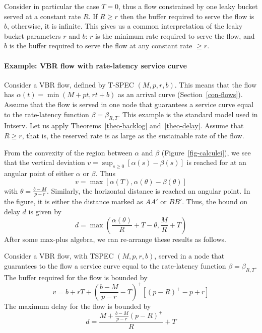 Consider in particular the case $T=0$, thus a flow constrained by
one leaky bucket served at a constant rate $R$. If $R\geq r$ then
the buffer required to serve the flow is $b$, otherwise, it is
infinite. This gives us a common interpretation of the leaky
bucket parameters $r$ and $b$: $r$ is the minimum rate required to
serve the flow, and $b$ is the buffer required to serve the flow
at any constant rate $\geq r$.


\paragraph{Example: VBR flow with rate-latency service curve}
Consider a VBR flow, defined by T-SPEC $(M, p, r, b)$. This means
that the flow has $\alpha(t) = \min(M+pt, rt+b)$ as an arrival
curve (Section~\ref{con-flows}). Assume that the flow is served in
one node that guarantees a service curve equal to the rate-latency
function $\beta=\beta_{R,T}$. This example is the standard model
used in Intserv. Let us apply Theorems~\ref{theo-backlog}
and~\ref{theo-delay}.  Assume that $R \geq r$, that is, the
reserved rate is as large as the sustainable rate of the flow.

From the convexity of the region between $\alpha$ and $\beta$
(Figure~\ref{fig-calculei}), we see that the vertical deviation
$v=\sup_{s \geq 0}[\alpha(s)-\beta(s)]$ is reached for at an
angular point of either $\alpha$ or $\beta$. Thus
$$v = \max [\alpha(T), \alpha(\theta)-\beta(\theta)]
$$with $\theta =\frac{b-M}{p-r}$.
Similarly, the horizontal distance is reached an angular point. In
the figure, it is either the distance marked as $AA'$ or $BB'$.
Thus, the bound on delay $d$ is given by
$$d = \max \left( \frac{\alpha(\theta)}{R}+T-\theta, \frac{M}{R}+T \right)$$
After some max-plus algebra, we can re-arrange these results as
follows.
\begin{proposition}
Consider a VBR flow, with TSPEC $(M, p,
r, b)$, served in a node that guarantees to the flow a service
curve equal to the rate-latency function $\beta=\beta_{R,T}$. The
buffer required for the flow is bounded by
$$v=b + r T + \left(\frac{b-M}{p-r} - T\right)^+ [(p-R)^+ -p + r]
$$ The maximum delay for the flow is bounded by
$$d=\frac{M + \frac{b-M}{p-r}(p-R)^+ }{R} +T$$
\end{proposition}
\begin{figure}[htbp]
\end{figure}

